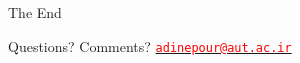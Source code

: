 \documentclass[
	12pt, %
]{beamer}
\begin{document}

%	


\begin{frame}[plain] %
	\begin{center}
		{\Huge The End}
		
		\bigskip\bigskip %
		
		{\LARGE Questions? Comments?}\vfil
		\texttt{\href{mailto:adinepour@aut.ac.ir}{\textcolor{red}{adinepour@aut.ac.ir}}}
	\end{center}
\end{frame}

\end{document}
